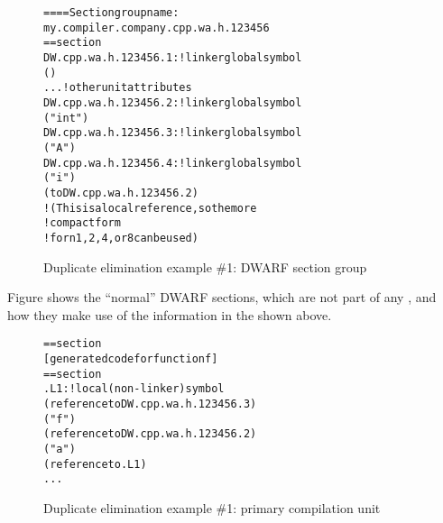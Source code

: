 \begin{figure}
\begin{dwflisting}
\begin{alltt}
==== Section group name:
    my.compiler.company.cpp.wa.h.123456
== section \dotdebuginfo{}
DW.cpp.wa.h.123456.1:     ! linker global symbol
        ()
        ...  ! other unit attributes
DW.cpp.wa.h.123456.2:     ! linker global symbol
        ("int")
DW.cpp.wa.h.123456.3:     ! linker global symbol
        ("A")
DW.cpp.wa.h.123456.4:     ! linker global symbol
        ("i")
        ( to DW.cpp.wa.h.123456.2)
            ! (This is a local reference, so the more
            ! compact form  
            ! for n 1,2,4, or 8 can be used)
\end{alltt}
\end{dwflisting}
\vspace{2mm}
\caption{Duplicate elimination example \#1: DWARF section group} 
\label{fig:duplicateeliminationexample1dwarfsectiongroup}
\end{figure}

Figure 
shows the ``normal'' DWARF sections, which are not part of
any , 
and how they make use of the information
in the  shown above.

\begin{figure}
\begin{dwflisting}
\begin{alltt}
== section \dottext{}
    [generated code for function f]
== section \dotdebuginfo{}
.L1:                           ! local (non-linker) symbol
            (reference to DW.cpp.wa.h.123456.3)
            ("f")
            (reference to DW.cpp.wa.h.123456.2)
                ("a")
                (reference to .L1)
        ...
\end{alltt}
\end{dwflisting}
\caption{Duplicate elimination example \#1: primary compilation unit} 
\label{fig:duplicateeliminationexample1primarycompilationunit}
\end{figure}

